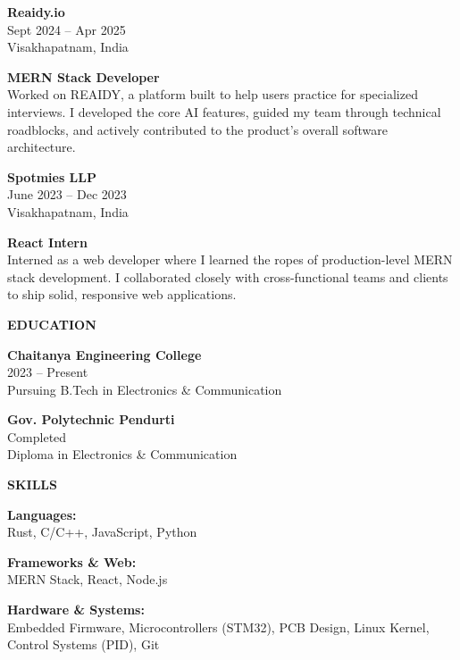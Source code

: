 \documentclass[10pt,a4paper]{article}
\newcommand{\cventry}[6]{
    \noindent
    \begin{minipage}[t]{0.22\textwidth}
        \raggedright
        \textbf{#1} \\[0.4em]
        \textcolor{textgray}{\scriptsize #2} \\[0.2em]
        \textcolor{textgray}{\scriptsize #3}
    \end{minipage}%
    \begin{minipage}[t]{0.04\textwidth}
        \centering \vspace{0.2em} \textcolor{linegray}{\textbullet}
    \end{minipage}%
    \begin{minipage}[t]{0.74\textwidth}
        \raggedright
        \textbf{#4} #5 \\[0.4em]
        \small #6
    \end{minipage}
    \par\vspace{1.2em}
}
\begin{document}
\cventry{Reaidy.io}{Sept 2024 -- Apr 2025}{Visakhapatnam, India}{MERN Stack Developer}{}{
    Worked on REAIDY, a platform built to help users practice for specialized interviews. I developed the core AI features, guided my team through technical roadblocks, and actively contributed to the product's overall software architecture.
}

\cventry{Spotmies LLP}{June 2023 -- Dec 2023}{Visakhapatnam, India}{React Intern}{}{
    Interned as a web developer where I learned the ropes of production-level MERN stack development. I collaborated closely with cross-functional teams and clients to ship solid, responsive web applications.
}

\vspace{0.5em}
\noindent
\begin{minipage}[t]{0.46\textwidth}
    \textbf{\uppercase{Education}} \hspace{0.5em} {\color{linegray}\hrulefill}
    \vspace{1.2em}
    
    \textbf{Chaitanya Engineering College} \\
    \textcolor{textgray}{\small 2023 -- Present} \\
    \small Pursuing B.Tech in Electronics \& Communication
    \vspace{1.5em}
    
    \textbf{Gov. Polytechnic Pendurti} \\
    \textcolor{textgray}{\small Completed} \\
    \small Diploma in Electronics \& Communication
\end{minipage}
\hfill
\begin{minipage}[t]{0.48\textwidth}
    \textbf{\uppercase{Skills}} \hspace{0.5em} {\color{linegray}\hrulefill}
    \vspace{1.2em}
    
    \textbf{Languages:} \\
    \textcolor{textgray}{\small Rust, C/C++, JavaScript, Python}
    \vspace{0.8em}
    
    \textbf{Frameworks \& Web:} \\
    \textcolor{textgray}{\small MERN Stack, React, Node.js}
    \vspace{0.8em}
    
    \textbf{Hardware \& Systems:} \\
    \textcolor{textgray}{\small Embedded Firmware, Microcontrollers (STM32), PCB Design, Linux Kernel, Control Systems (PID), Git}
\end{minipage}
\vspace{0.5em}
\end{document}

